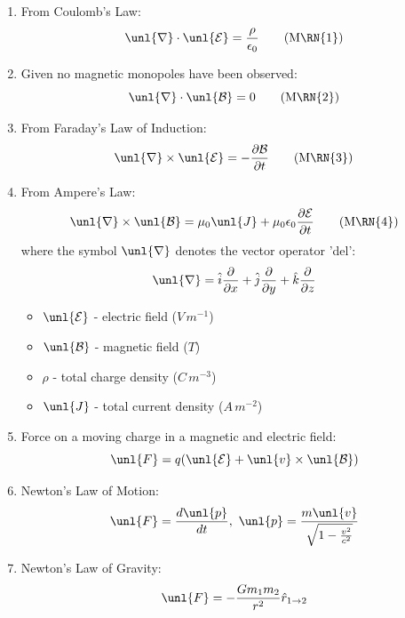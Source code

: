 \documentclass[a4paper, 11pt, normalem]{report}
\newcommand\p{\partial}
\newcommand\E{\mathcal{E}}
\newcommand\uE{\unl{\E}}
\newcommand\B{\mathcal{B}}
\newcommand\uB{\unl{\B}}
\newcommand\del{\unl{\nabla}}
\newcommand\eno{\epsilon_0}
\newcommand\hi{\hat{i}}
\newcommand\hj{\hat{j}}
\newcommand\hk{\hat{k}}
\begin{document}
\begin{enumerate}
    \item From Coulomb's Law:
        \begin{equation}
            \del\cdot\uE = \frac{\rho}{\epsilon_0} \tag{M\RN{1}}
        \end{equation}
    \item Given no magnetic monopoles have been observed:
        \begin{equation}
            \del\cdot \uB = 0 \tag{M\RN{2}}
        \end{equation}
    \item From Faraday's Law of Induction:
        \begin{equation}
            \del \times \uE = -\frac{\p \B}{\p t} \tag{M\RN{3}}
        \end{equation}
    \item From Ampere's Law:
        \begin{equation}
            \del \times \uB = \mu_0 \unl{J} + \mu_0 \eno \frac{\p \E}{\p t} \tag{M\RN{4}}
        \end{equation}
        where the symbol $\del$ denotes the vector operator 'del':
        \begin{equation*}
            \del = \hi \frac{\p}{\p x} + \hj \frac{\p}{\p y} + \hk \frac{\p}{\p z}
        \end{equation*}
        \begin{itemize}
            \item $\uE$ - electric field ($V\,m^{-1}$)
            \item $\uB$ - magnetic field ($T$)
            \item $\rho$ - total charge density ($C\,m^{-3}$)
            \item $\unl{J}$ - total current density ($A\,m^{-2}$)
        \end{itemize}
    \item Force on a moving charge in a magnetic and electric field:
        \begin{equation*}
            \unl{F} = q(\uE + \unl{v} \times \uB)
        \end{equation*}
    \item Newton's Law of Motion:
        \begin{equation*}
            \unl{F} = \frac{d\unl{p}}{dt}, ~ \unl{p} = \frac{m\unl{v}}{\sqrt{1 - \frac{v^2}{c^2}}}
        \end{equation*}
    \item Newton's Law of Gravity:
        \begin{equation*}
            \unl{F} = -\frac{Gm_1 m_2}{r^2}\hat{r}_{1 \to 2}
        \end{equation*}
\end{enumerate}
\end{document}
